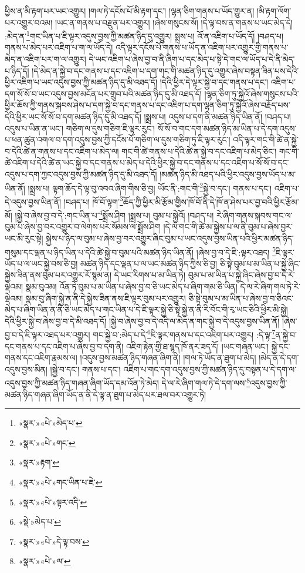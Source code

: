 ཕྱིས་ན་མི་རྟག་པར་ཡང་འགྱུར། །གལ་ཏེ་དངོས་པོ་མི་རྟག་དང་། །ལྷན་ཅིག་གནས་པ་ཡོད་གྱུར་ན། །མི་རྟག་ལོག་པར་འགྱུར་བའམ། །ཡང་ན་གནས་པ་བརྫུན་པར་འགྱུར། །ཞེས་གསུངས་སོ། །དེ་ལྟ་བས་ན་གནས་པ་ཡང་མེད་དེ། :མེད་ན་\footnote{«སྣར་»«པེ་»མེད་པ་}གང་ཡིན་པ་ཇི་ལྟར་འདུས་བྱས་ཀྱི་མཚན་ཉིད་དུ་འགྱུར། སྨྲས་པ། འོ་ན་འཇིག་པ་ཡོད་དོ། །བཤད་པ། གནས་པ་མེད་པར་འཇིག་པ་ག་ལ་ཡོད་དེ། འདི་ལྟར་དངོས་པོ་གནས་པ་ཡོད་ན་འཇིག་པར་འགྱུར་གྱི་གནས་པ་མེད་ན་འཇིག་པར་ག་ལ་འགྱུར། དེ་ཡང་འཇིག་པ་ཞེས་བྱ་བ་ནི་ཞིག་པ་དང་མེད་པ་སྟེ་དེ་གང་ལ་ཡོད་པ་དེ་ནི་མེད་པ་ཉིད་དོ། །དེ་མེད་ན་སྐྱེ་བ་དང་གནས་པ་དང་འཇིག་པ་དག་གང་གི་མཚན་ཉིད་དུ་འགྱུར་ཞེས་བསྟན་ཟིན་པས་དེའི་ཕྱིར་འཇིག་པ་ཡང་འདུས་བྱས་ཀྱི་མཚན་ཉིད་དུ་མི་འཐད་དོ། །དེའི་ཕྱིར་དེ་ལྟར་སྐྱེ་བ་དང་གནས་པ་དང་། འཇིག་པ་དག་སོ་སོ་བ་ཡང་འདུས་བྱས་མངོན་པར་གྲུབ་པའི་མཚན་ཉིད་དུ་མི་འཐད་དོ། །ལྷན་ཅིག་ཏུ་སྐྱེའོ་ཞེས་གསུངས་པའི་ཕྱིར་ཆོས་ཀྱི་གནས་སྐབས་ཤེས་པ་དག་སྐྱེ་བ་དང་གནས་པ་དང་འཇིག་པ་དག་ལྷན་ཅིག་ཏུ་སྐྱེའོ་ཞེས་བརྗོད་པས་དེའི་ཕྱིར་ཡང་སོ་སོ་བ་དག་མཚན་ཉིད་དུ་མི་འཐད་དོ། །སྨྲས་པ། འདུས་པ་དག་ནི་མཚན་ཉིད་ཡིན་ནོ། །བཤད་པ། འདུས་པ་ཡིན་ན་ཡང་། གཅིག་ལ་དུས་གཅིག་ཇི་ལྟར་རུང་། སོ་སོ་བ་གང་དག་མཚན་ཉིད་མ་ཡིན་པ་དེ་དག་འདུས་པ་ཕན་ཚུན་འགལ་བ་དག་འདུས་བྱས་ཀྱི་དངོས་པོ་གཅིག་ལ་དུས་གཅིག་ཏུ་ཇི་ལྟར་རུང་། འདི་ལྟར་གང་གི་ཚེ་ན་སྐྱེ་བ་དེའི་ཚེ་ན་གནས་པ་དང་འཇིག་པ་མེད་ལ། གང་གི་ཚེ་གནས་པ་དེའི་ཚེ་ན་སྐྱེ་བ་དང་འཇིག་པ་མེད་ཅིང་། གང་གི་ཚེ་འཇིག་པ་དེའི་ཚེ་ན་ཡང་སྐྱེ་བ་དང་གནས་པ་མེད་པ་དེའི་ཕྱིར་སྐྱེ་བ་དང་གནས་པ་དང་འཇིག་པ་སོ་སོ་བ་དང་འདུས་པ་དག་ཀྱང་འདུས་བྱས་ཀྱི་མཚན་ཉིད་དུ་མི་འཐད་དོ། །མཚན་ཉིད་མི་འཐད་པའི་ཕྱིར་འདུས་བྱས་ཡོད་པ་མ་ཡིན་ནོ། །སྨྲས་པ། ལྟག་ཆོད་དེ་ལྟ་བུ་འབའ་ཞིག་གིས་ཅི་བྱ། ཡོང་ནི་:གང་གི་\footnote{«སྣར་»«པེ་»གང་}སྐྱེ་བ་དང་། གནས་པ་དང་། འཇིག་པ་དེ་འདུས་བྱས་ཡིན་ནོ། །བཤད་པ། ཁོ་བོ་ལྟག་\footnote{«སྣར་»རྟག་}ཆོད་ཀྱི་ཕྱིར་མི་རྩོམ་གྱིས་ཁོ་བོ་ནི་དེ་ཁོ་ན་ཤེས་པར་བྱ་བའི་ཕྱིར་རྩོམ་མོ། །སྐྱེ་བ་ཞེས་བྱ་བ་དེ་:གང་ཡིན་པ་\footnote{«སྣར་»«པེ་»གང་ཡིན་པ་ཇེ་}སྨྲོས་ཤིག །སྨྲས་པ། བུམ་པ་སྐྱེའོ། །བཤད་པ། རེ་ཞིག་གནས་སྐབས་གང་ལ་བུམ་པ་ཞེས་བྱ་བར་འགྱུར་བ་ལེགས་པར་སོམས་ལ་སྨྲོས་ཤིག །དེ་ལ་གང་གི་ཚེ་མ་སྐྱེས་པ་ལ་ནི་བུམ་པ་ཞེས་བྱར་ཡང་མི་རུང་སྟེ། སྐྱེས་པ་ཉིད་ལ་བུམ་པ་ཞེས་བྱ་བར་འགྱུར་ཞིང་བུམ་པ་ཡང་འདུས་བྱས་ཡིན་པའི་ཕྱིར་མཚན་ཉིད་གསུམ་དང་ལྡན་པ་ཉིད་ཡིན་པ་དེའི་ཚེ་སྐྱེ་བ་བུམ་པའི་མཚན་ཉིད་ཡིན་ནོ། །ཞེས་བྱ་བ་དེ་ཇི་:ལྟར་འཐད། \footnote{«སྣར་»«པེ་»ལྟར་འདི་}ཇི་ལྟར་ཡོད་པ་ལ་ཡང་སྐྱེ་བས་ཅི་བྱ། མཚན་ཉིད་དང་ལྡན་པ་ལ་ཡང་མཚན་ཉིད་ཀྱིས་ཅི་བྱ། ཅི་སྟེ་བུམ་པ་མ་ཡིན་པ་སྐྱེ་ཞིང་སྐྱེས་ཟིན་ནས་བུམ་པར་འགྱུར་རོ་སྙམ་ན། དེ་ཡང་རིགས་པ་མ་ཡིན་ཏེ། བུམ་པ་མ་ཡིན་པ་སྐྱེ་ཞིང་ཞེས་བྱ་བ་དེ་རེ་ལྡེའམ། སྣམ་བུའམ། འོན་ཏེ་བུམ་པ་མ་ཡིན་པ་ཞེས་བྱ་བ་ཅི་ཡང་མེད་པ་ཞིག་གམ་ཅི་ཡིན། དེ་ལ་རེ་ཞིག་གལ་ཏེ་རེ་ལྡེའམ། སྣམ་བུ་ཞིག་སྐྱེ་ན་ནི་དེ་སྐྱེས་ཟིན་ནས་ཇི་ལྟར་བུམ་པར་འགྱུར། ཅི་སྟེ་བུམ་པ་མ་ཡིན་པ་ཞེས་བྱ་བ་ཅིའང་མེད་པ་ཞིག་ཡིན་ན་ནི་ཅི་ཡང་མེད་པ་གང་ཡིན་པ་དེ་ཇི་ལྟར་སྐྱེ་ཅི་སྟེ་སྐྱེ་ན་ནི་རི་བོང་གི་རྭ་ཡང་ཅིའི་ཕྱིར་མི་སྐྱེ། དེའི་ཕྱིར་སྐྱེ་བ་ཞེས་བྱ་བ་དེ་མི་འཐད་དོ། །སྐྱེ་བ་ཞེས་བྱ་བ་དེ་འདི་ལ་མེད་ན་གང་སྐྱེ་བ་དེ་འདུས་བྱས་ཡིན་ནོ། །ཞེས་བྱ་བ་དེ་ཇི་ལྟར་འཐད་པར་འགྱུར། གང་སྐྱེ་བ་:མེད་པ་དེ་\footnote{«སྡེ་»མེད་པ་}ཇི་ལྟར་གནས་པ་དང་འཇིག་པར་འགྱུར། :དེ་ལྟ་\footnote{«སྣར་»«པེ་»དེ་ལྟ་བས་}ན་སྐྱེ་བ་དང་གནས་པ་དང་འཇིག་པ་ཞེས་བྱ་བ་དག་ནི། འཇིག་རྟེན་གྱི་ཐ་སྙད་ཁོ་ནར་ཟད་དོ། །ཡང་གཞན་ཡང་། སྐྱེ་དང་གནས་དང་འཇིག་རྣམས་ལ། །འདུས་བྱས་མཚན་ཉིད་གཞན་ཞིག་ནི། །གལ་ཏེ་ཡོད་ན་ཐུག་པ་མེད། །མེད་ན་དེ་དག་འདུས་བྱས་མིན། །སྐྱེ་བ་དང་། གནས་པ་དང་། འཇིག་པ་གང་དག་འདུས་བྱས་ཀྱི་མཚན་ཉིད་དུ་བསྟན་པ་དེ་དག་ལ་འདུས་བྱས་ཀྱི་མཚན་ཉིད་གཞན་ཞིག་ཡོད་དམ་འོན་ཏེ་མེད། དེ་ལ་རེ་ཞིག་གལ་ཏེ་དེ་དག་ལས་\footnote{«སྣར་»«པེ་»ལ་}འདུས་བྱས་ཀྱི་མཚན་ཉིད་གཞན་ཞིག་ཡོད་ན་ནི་དེ་ལྟ་ན་ཐུག་པ་མེད་པར་ཐལ་བར་འགྱུར་ཏེ། 